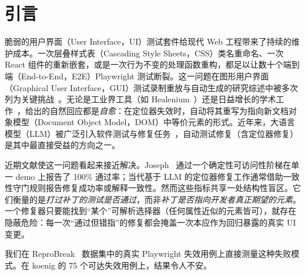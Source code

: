 \section{引言}
\label{sec:intro}

脆弱的用户界面（User Interface，UI）测试套件给现代 Web 工程带来了持续的维护成本。一次层叠样式表（Cascading Style Sheets，CSS）类名重命名、一次 React 组件的重新嵌套，或是一次行为不变的处理函数重构，都足以让数十个端到端（End-to-End，E2E）Playwright 测试断裂。这一问题在图形用户界面（Graphical User Interface，GUI）测试录制重放与自动生成的研究综述中被多次列为关键挑战~\cite{li2022androidReplay, wang2025mobileGui}。无论是工业界工具（如 Healenium~\cite{healenium}）还是日益增长的学术工作~\cite{joseph2026zerocost, mouraReproBreak2026}，给出的自然回应都是\emph{自愈}：在定位器失效时，自动将其重写为指向新文档对象模型（Document Object Model，DOM）中等价元素的形式。近年来，大语言模型（LLM）被广泛引入软件测试与修复任务~\cite{xiang2025llmRepair, li2025llmFuzzing}，自动测试修复（含定位器修复）是其中最直接受益的方向之一。

近期文献使这一问题看起来接近解决。Joseph~\cite{joseph2026zerocost} 通过一个确定性可访问性阶梯在单一 demo 上报告了 100\% 通过率；当代基于 LLM 的定位器修复工作通常借助一致性守门规则报告修复成功率或解释一致性。然而这些指标共享一处结构性盲区。它们衡量的是\emph{打过补丁的测试是否通过}，而非\emph{补丁是否指向开发者真正期望的元素}。一个修复器只要能找到“某个”可解析选择器（任何属性近似的元素皆可），就存在隐蔽危险：每一次“通过但错指”的修复都会掩盖一次本应作为回归暴露的真实 UI 变更。

我们在 ReproBreak~\cite{mouraReproBreak2026} 数据集中的真实 Playwright 失效用例上直接测量这种失败模式。在 koenig 的 75 个可达失效用例上，结果令人不安。

